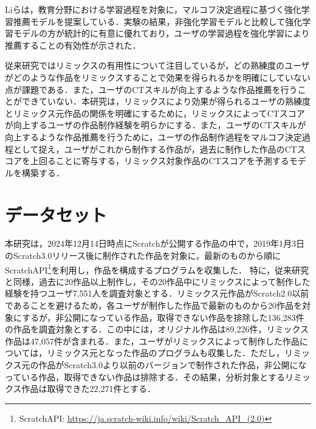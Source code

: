 \documentclass[submit,techrep,noauthor]{ipsj}
\begin{document}
Liらは，教育分野における学習過程を対象に，マルコフ決定過程に基づく強化学習推薦モデルを提案している\cite{10.1145/3637528.3671872}．実験の結果，非強化学習モデルと比較して強化学習モデルの方が統計的に有意に優れており，ユーザの学習過程を強化学習により推薦することの有効性が示された．

従来研究ではリミックスの有用性について注目しているが，どの熟練度のユーザがどのような作品をリミックスすることで効果を得られるかを明確にしていない点が課題である．また，ユーザのCTスキルが向上するような作品推薦を行うことができていない．本研究は，リミックスにより効果が得られるユーザの熟練度とリミックス元作品の関係を明確にするために，リミックスによってCTスコアが向上するユーザの作品制作経験を明らかにする．また，ユーザのCTスキルが向上するような作品推薦を行うために，ユーザの作品制作過程をマルコフ決定過程として捉え，ユーザがこれから制作する作品が，過去に制作した作品のCTスコアを上回ることに寄与する，リミックス対象作品のCTスコアを予測するモデルを構築する．


\section{データセット}
\label{sec:dataset}

本研究は，2024年12月14日時点にScratchが公開する作品の中で，2019年1月3日のScratch3.0リリース後に制作された作品を対象に，最新のものから順に
ScratchAPI\footnote{ScratchAPI: \url{https://ja.scratch-wiki.info/wiki/Scratch_API_(2.0)}}を利用し，作品を構成するプログラムを収集した．
特に，従来研究\cite{hashitani2022scratch}と同様，過去に20作品以上制作し，その20作品中にリミックスによって制作した経験を持つユーザ7,551人を調査対象とする．リミックス元作品がScratch2.0以前であることを避けるため，各ユーザが制作した作品で最新のものから20作品を対象にするが，非公開になっている作品，取得できない作品を排除した136,283件の作品を調査対象とする．この中には，オリジナル作品は89,226件，リミックス作品は47,057件が含まれる．また，ユーザがリミックスによって制作した作品については，リミックス元となった作品のプログラムも収集した．ただし，リミックス元の作品がScratch3.0より以前のバージョンで制作された作品，非公開になっている作品，取得できない作品は排除する．その結果，分析対象とするリミックス作品は取得できた22,271件とする．
\end{document}
